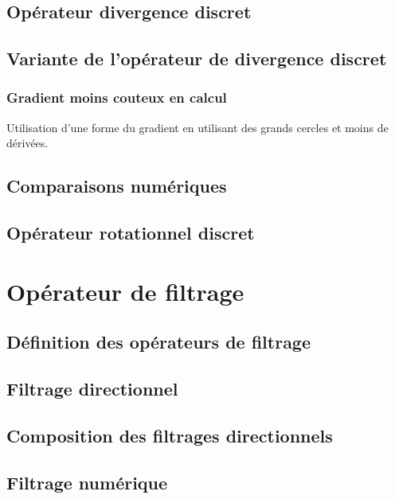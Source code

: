 \subsection{Opérateur divergence discret}

\subsection{Variante de l'opérateur de divergence discret}

\subsubsection{Gradient moins couteux en calcul}

Utilisation d'une forme du gradient en utilisant des grands cercles et moins de dérivées.

\subsection{Comparaisons numériques}









\subsection{Opérateur rotationnel discret}










\section{Opérateur de filtrage}

\subsection{Définition des opérateurs de filtrage}

\subsection{Filtrage directionnel}

\subsection{Composition des filtrages directionnels}

\subsection{Filtrage numérique}
